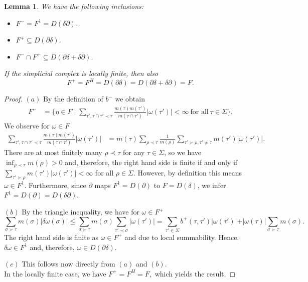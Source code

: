 \documentclass[10pt]{amsart}
\newtheorem{lemma}[theorem]{Lemma}
\theoremstyle{definition}
\newcommand{\F}{{F}}
\begin{document}
\begin{lemma}
	We have the following inclusions:
	\begin{itemize}
		\item [(a)] $F^{-}=F^{1}=D(\delta\partial)$.
		\item [(b)] $F^{+}\subseteq D(\partial \delta)$.		
		\item [(c)] $F^{-}\cap F^{+}\subseteq D(\partial\delta+\delta\partial)$.
	\end{itemize}
	If the simplicial complex is locally finite, then also $$\F^{+}=\F^{H}= D(\partial \delta)= D(\partial\delta+\delta\partial)=\F.$$
\end{lemma} 
\begin{proof}
	$(a)$ By the definition of $b^{-}$ we obtain
	\begin{align*}
		F^{-}&=\lbrace \eta\in F\mid\sum_{\tau',\tau\cap\tau'\prec\tau}\frac{m(\tau)m(\tau')}{m(\tau\cap\tau')}\vert\omega(\tau')\vert<\infty~\text{for all}~\tau\in\Sigma\rbrace.
	\end{align*}
	We observe for $\omega\in F$
	\begin{align*}
		\sum_{\tau',\tau\cap\tau'\prec\tau}\frac{m(\tau)m(\tau')}{m(\tau\cap\tau')}\vert\omega(\tau')\vert&=	m(\tau)\sum_{\rho\prec \tau} \frac{1}{m(\rho)} \sum_{\tau'\succ\rho,\tau'\neq\tau} m(\tau')\vert\omega(\tau')\vert.
	\end{align*}
	There are at most finitely many $\rho\prec\tau$ for any $\tau\in\Sigma$, so we have $\inf_{\rho\prec \tau}m(\rho)>0$ and, therefore, the right hand side is finite if and only if $\sum_{\tau'\succ\rho} m(\tau')\vert\omega(\tau')\vert<\infty$ for all $\rho\in \Sigma$. However, by definition this means $\omega\in F^{1}$. Furthermore, since $\partial$ maps $F^{1}=D(\partial)$ to $F=D(\delta)$, we infer $F^{1}=D(\partial)=D(\delta\partial)$. 
	
	$(b) $ By the triangle inequality, we have for $\omega\in F^{
		+}$
	\begin{equation*}
		\sum_{\sigma\succ\tau}  m(\sigma)|\delta \omega(\sigma)|\leq 	\sum_{\sigma\succ\tau}  m(\sigma)\sum_{\tau'\prec \sigma}|\omega(\tau')|=\sum_{\tau'\in \Sigma} b^{+}(\tau,\tau')|\omega(\tau')|+\vert\omega(\tau)\vert\sum_{\sigma\succ\tau}m(\sigma). 
	\end{equation*}
	The right hand side is finite as $\omega\in F^+$ and due to local summability. Hence, $\delta\omega\in F^{1}$ and, therefore, $\omega \in D(\partial\delta)$.
	
$(c)$ This follows now directly from $(a)$ and $(b).$\\
In the locally finite case, we have $ \F^{+}=\F^{H}=\F,$ which yields the result.
\end{proof}
\end{document}
